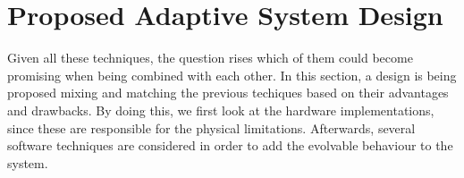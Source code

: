 
\section{Proposed Adaptive System Design}
\label{sec:proposition}

Given all these techniques, the question rises which of them could become promising when being combined with each other. In this section, a design is being proposed mixing and matching the previous techiques based on their advantages and drawbacks. By doing this, we first look at the hardware implementations, since these are responsible for the physical limitations. Afterwards, several software techniques are considered in order to add the evolvable behaviour to the system.



